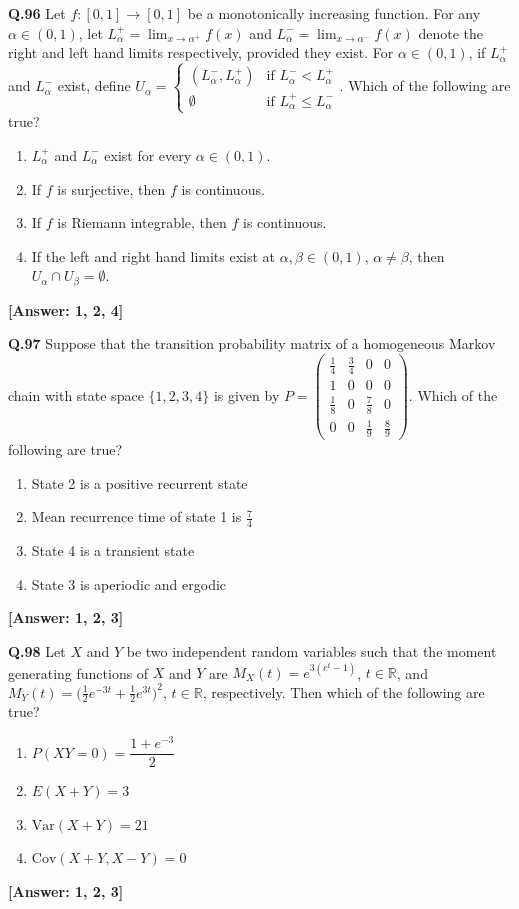 \documentclass[12pt,a4paper]{article}
\newcommand{\ans}[1]{\quad\textcolor{anscolor}{\textbf{[Answer: #1]}}}
\begin{document}
\textbf{Q.96} Let $f:[0,1]\to[0,1]$ be a monotonically increasing function. For any $\alpha\in(0,1)$, let $L_\alpha^+=\lim_{x\to\alpha^+}f(x)$ and $L_\alpha^-=\lim_{x\to\alpha^-}f(x)$ denote the right and left hand limits respectively, provided they exist. For $\alpha\in(0,1)$, if $L_\alpha^+$ and $L_\alpha^-$ exist, define $U_\alpha=\begin{cases}(L_\alpha^-,L_\alpha^+)&\text{if }L_\alpha^-<L_\alpha^+\\\emptyset&\text{if }L_\alpha^+\le L_\alpha^-\end{cases}$. Which of the following are true?
\begin{enumerate}[label=\arabic*.]
\item $L_\alpha^+$ and $L_\alpha^-$ exist for every $\alpha\in(0,1)$.
\item If $f$ is surjective, then $f$ is continuous.
\item If $f$ is Riemann integrable, then $f$ is continuous.
\item If the left and right hand limits exist at $\alpha,\beta\in(0,1)$, $\alpha\neq\beta$, then $U_\alpha\cap U_\beta=\emptyset$.
\end{enumerate}\ans{1, 2, 4}

\textbf{Q.97} Suppose that the transition probability matrix of a homogeneous Markov chain with state space $\{1,2,3,4\}$ is given by $P=\begin{pmatrix}\tfrac{1}{4}&\tfrac{3}{4}&0&0\\1&0&0&0\\\tfrac{1}{8}&0&\tfrac{7}{8}&0\\0&0&\tfrac{1}{9}&\tfrac{8}{9}\end{pmatrix}$. Which of the following are true?
\begin{enumerate}[label=\arabic*.]
\item State 2 is a positive recurrent state \item Mean recurrence time of state 1 is $\tfrac{7}{4}$
\item State 4 is a transient state \item State 3 is aperiodic and ergodic
\end{enumerate}\ans{1, 2, 3}

\textbf{Q.98} Let $X$ and $Y$ be two independent random variables such that the moment generating functions of $X$ and $Y$ are $M_X(t)=e^{3(e^t-1)}$, $t\in\mathbb{R}$, and $M_Y(t)=\bigl(\tfrac{1}{2}e^{-3t}+\tfrac{1}{2}e^{3t}\bigr)^2$, $t\in\mathbb{R}$, respectively. Then which of the following are true?
\begin{enumerate}[label=\arabic*.]
\item $P(XY=0)=\dfrac{1+e^{-3}}{2}$ \item $E(X+Y)=3$
\item $\text{Var}(X+Y)=21$ \item $\text{Cov}(X+Y,X-Y)=0$
\end{enumerate}\ans{1, 2, 3}
\end{document}
